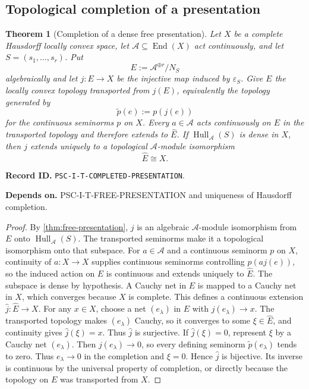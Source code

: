 \documentclass[11pt]{article}
\newtheorem{theorem}{Theorem}[section]
\theoremstyle{definition}
\theoremstyle{remark}
\newcommand{\A}{\mathcal A}
\newcommand{\Hull}{\operatorname{Hull}}
\newcommand{\End}{\operatorname{End}}
\newcommand{\RecordID}[1]{\par\smallskip\noindent\begingroup\footnotesize\color{PSCGray}\raggedright\textbf{Record ID.} \nolinkurl{#1}.\par\endgroup}
\newcommand{\Depends}[1]{\par\noindent\begingroup\footnotesize\color{PSCGray}\raggedright\textbf{Depends on.} #1\par\endgroup}
\begin{document}
\subsection{Topological completion of a presentation}
\begin{theorem}[Completion of a dense free presentation]
\label{thm:completed-presentation}
Let $X$ be a complete Hausdorff locally convex space, let $\A\subseteq\End(X)$ act continuously, and let $S=(s_1,\ldots,s_r)$.  Put
\[
E:=\A^{\oplus r}/N_S
\]
algebraically and let $j:E\to X$ be the injective map induced by $\varepsilon_S$.  Give $E$ the locally convex topology transported from $j(E)$, equivalently the topology generated by
\[
\widetilde p(e):=p(j(e))
\]
for the continuous seminorms $p$ on $X$.  Every $a\in\A$ acts continuously on $E$ in the transported topology and therefore extends to $\widehat E$.  If $\Hull_{\A}(S)$ is dense in $X$, then $j$ extends uniquely to a topological $\A$-module isomorphism
\[
\boxed{\widehat E\cong X.}
\]
\end{theorem}
\RecordID{PSC-I-T-COMPLETED-PRESENTATION}
\Depends{PSC-I-T-FREE-PRESENTATION and uniqueness of Hausdorff completion.}

\begin{proof}
By \cref{thm:free-presentation}, $j$ is an algebraic $\A$-module isomorphism from $E$ onto $\Hull_{\A}(S)$.  The transported seminorms make it a topological isomorphism onto that subspace.  For $a\in\A$ and a continuous seminorm $p$ on $X$, continuity of $a:X\to X$ supplies continuous seminorms controlling $p(aj(e))$, so the induced action on $E$ is continuous and extends uniquely to $\widehat E$.  The subspace is dense by hypothesis.  A Cauchy net in $E$ is mapped to a Cauchy net in $X$, which converges because $X$ is complete.  This defines a continuous extension $\widehat j:\widehat E\to X$.  For any $x\in X$, choose a net $(e_\lambda)$ in $E$ with $j(e_\lambda)\to x$.  The transported topology makes $(e_\lambda)$ Cauchy, so it converges to some $\xi\in\widehat E$, and continuity gives $\widehat j(\xi)=x$.  Thus $\widehat j$ is surjective.  If $\widehat j(\xi)=0$, represent $\xi$ by a Cauchy net $(e_\lambda)$.  Then $j(e_\lambda)\to0$, so every defining seminorm $\widetilde p(e_\lambda)$ tends to zero.  Thus $e_\lambda\to0$ in the completion and $\xi=0$.  Hence $\widehat j$ is bijective.  Its inverse is continuous by the universal property of completion, or directly because the topology on $E$ was transported from $X$.
\end{proof}
\end{document}
